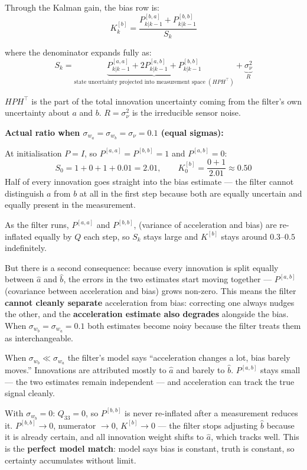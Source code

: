 \documentclass[12pt, a4paper]{article}
\begin{document}
Through the Kalman gain, the bias row is:
\[
  K_k^{[b]} = \frac{P_{k|k-1}^{[b,a]} + P_{k|k-1}^{[b,b]}}{S_k}
\]

where the denominator expands fully as:
\[
  S_k = \underbrace{P_{k|k-1}^{[a,a]} + 2P_{k|k-1}^{[a,b]} + P_{k|k-1}^{[b,b]}}_{\text{state uncertainty projected into measurement space }(H P H^\top)}
       + \underbrace{\sigma_\nu^2}_{R}
\]

$H P H^\top$ is the part of the total innovation uncertainty coming
from the filter's own uncertainty about $a$ and $b$.
$R = \sigma_\nu^2$ is the irreducible sensor noise.

\medskip
\textbf{Actual ratio when $\sigma_{w_a} = \sigma_{w_b} = \sigma_\nu = 0.1$
(equal sigmas):}

At initialisation $P = I$, so $P^{[a,a]} = P^{[b,b]} = 1$ and
$P^{[a,b]} = 0$:
\[
  S_0 = 1 + 0 + 1 + 0.01 = 2.01, \qquad
  K_0^{[b]} = \frac{0 + 1}{2.01} \approx 0.50
\]
Half of every innovation goes straight into the bias estimate ---
the filter cannot distinguish $a$ from $b$ at all in the first step
because both are equally uncertain and equally present in the measurement.

As the filter runs, $P^{[a,a]}$ and $P^{[b,b]}$, (variance of acceleration and bias) are re-inflated
equally by $Q$ each step, so $S_k$ stays large and $K^{[b]}$ stays
around $0.3$--$0.5$ indefinitely.

But there is a second consequence: because every innovation is split
equally between $\hat{a}$ and $\hat{b}$, the errors in the two
estimates start moving together --- $P^{[a,b]}$ (covariance between acceleration and bias) grows non-zero.
This means the filter \textbf{cannot cleanly separate} acceleration
from bias: correcting one always nudges the other, and the
\textbf{acceleration estimate also degrades} alongside the bias.
When $\sigma_{w_b} = \sigma_{w_a} = 0.1$ both estimates become noisy
because the filter treats them as interchangeable.

When $\sigma_{w_b} \ll \sigma_{w_a}$ the filter's model says
``acceleration changes a lot, bias barely moves.''
Innovations are attributed mostly to $\hat{a}$ and barely to $\hat{b}$.
$P^{[a,b]}$ stays small --- the two estimates remain independent ---
and acceleration can track the true signal cleanly.

With $\sigma_{w_b} = 0$: $Q_{33} = 0$, so $P^{[b,b]}$ is never
re-inflated after a measurement reduces it.
$P^{[b,b]} \to 0$, numerator $\to 0$, $K^{[b]} \to 0$ ---
the filter stops adjusting $\hat{b}$ because it is already certain,
and all innovation weight shifts to $\hat{a}$, which tracks well.
This is the \textbf{perfect model match}: model says bias is constant,
truth is constant, so certainty accumulates without limit.
\end{document}
